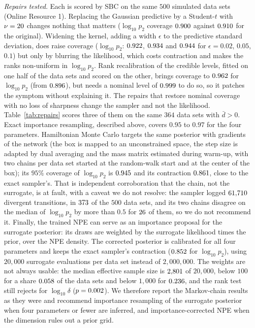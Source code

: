 \documentclass[sn-basic,iicol,pdflatex]{sn-jnl}
\begin{document}
\emph{Repairs tested.} Each is scored by SBC on the same $500$ simulated data sets (Online Resource 1). Replacing the Gaussian predictive by a Student-$t$ with $\nu=20$ changes nothing that matters
($\log_{10}p_2$ coverage $0.900$ against $0.910$ for the original). Widening the kernel, adding a width $\epsilon$ to the predictive standard deviation, does raise coverage
($\log_{10}p_2$: $0.922$, $0.934$ and $0.944$ for $\epsilon=0.02$, $0.05$, $0.1$) but only by blurring the likelihood, which costs contraction and makes
the ranks non-uniform in $\log_{10}p_2$. Rank recalibration of the credible levels, fitted on one half of the data sets and scored on the other, brings coverage to $0.962$ for $\log_{10}p_2$
(from $0.896$), but needs a nominal level of $0.999$ to do so, so it patches the symptom without explaining it. The repairs that restore nominal coverage with no loss of
sharpness change the sampler and not the likelihood. Table~\ref{tab:repairs} scores three of them on the same $364$ data sets with $\bar d>0$. Exact importance resampling, described above, covers $0.95$ to $0.97$ for the four parameters. Hamiltonian Monte Carlo targets the same posterior with gradients of the network (the box is mapped to an unconstrained space, the step size is adapted by dual averaging and the mass matrix estimated during warm-up, with two chains per data set started at the random-walk start and at the center of the box); its $95\%$ coverage of $\log_{10}p_2$ is $0.945$ and its contraction $0.861$, close to the exact sampler's. That is independent corroboration that the chain, not the surrogate, is at fault, with a caveat we do not resolve: the sampler logged $61{,}710$ divergent transitions, in $373$ of the $500$ data sets, and its two chains disagree on the median of $\log_{10}p_2$ by more than $0.5$ for $26$ of them, so we do not recommend it. Finally, the trained NPE can serve as an importance proposal for the surrogate posterior: its draws are weighted by the surrogate likelihood times the prior, over the NPE density. The corrected posterior is calibrated for all four parameters and keeps the exact sampler's contraction ($0.852$ for $\log_{10}p_2$), using $20{,}000$ surrogate evaluations per data set instead of $2{,}000{,}000$. The weights are not always usable: the median effective sample size is $2{,}801$ of $20{,}000$, below $100$ for a share $0.058$ of the data sets and below $1{,}000$ for $0.236$, and the rank test still rejects for $\log_{10}\delta$ ($p=0.002$). We therefore report the Markov-chain results as they were and recommend importance resampling of the surrogate posterior when four parameters or fewer are inferred, and importance-corrected NPE when the dimension rules out a prior grid.
\end{document}
